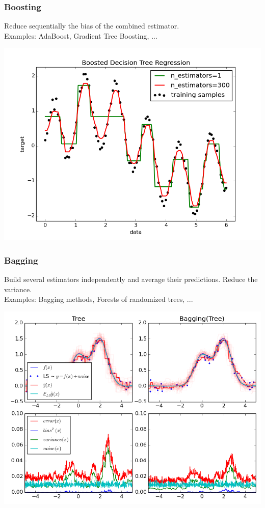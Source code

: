 \begin{frame}
\frametitle{Boosting}

Reduce sequentially the bias of the combined
estimator. \\

Examples: AdaBoost, Gradient Tree Boosting, ...\\

\begin{center}
\includegraphics[width=.75\linewidth]{sklearn_material/plot_adaboost_regression.png}
\end{center}

\end{frame}


\begin{frame}
\frametitle{Bagging}

Build several estimators independently and average their
predictions. Reduce the variance.\\

Examples: Bagging methods, Forests of randomized trees, ...\\

\begin{center}
\includegraphics[width=.7\linewidth]{sklearn_material/bias_variance.png}
\end{center}

\end{frame}



